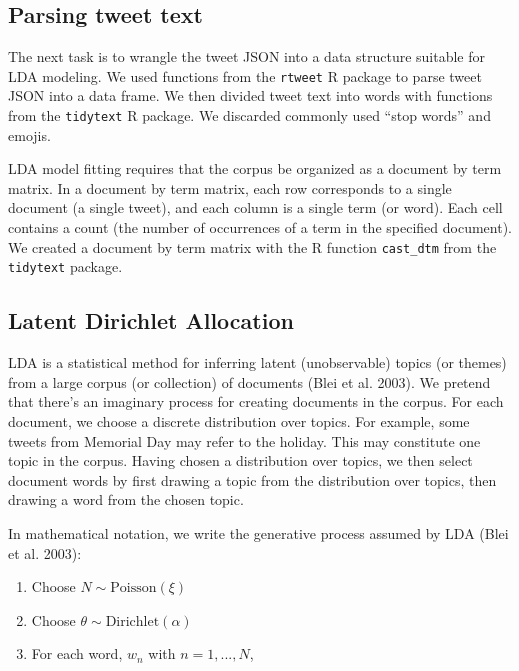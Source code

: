 \documentclass[
]{article}
\providecommand{\tightlist}{%
  \setlength{\itemsep}{0pt}\setlength{\parskip}{0pt}}
\begin{document}
\hypertarget{parsing-tweet-text}{%
\subsection{Parsing tweet text}\label{parsing-tweet-text}}

The next task is to wrangle the tweet JSON into a data structure suitable for LDA modeling.
We used functions from the \texttt{rtweet} R package to parse tweet JSON into a data frame.
We then divided tweet text into words with functions from the \texttt{tidytext} R package. We
discarded commonly used ``stop words'' and emojis.

LDA model fitting requires that the corpus be organized as a
document by term matrix. In a document by term matrix, each row corresponds to a single document (a single
tweet), and each column is a single term (or word). Each cell contains a
count (the number of
occurrences of a term in the specified document). We created a document by
term matrix with the R function \texttt{cast\_dtm} from the \texttt{tidytext} package.

\hypertarget{latent-dirichlet-allocation}{%
\subsection{Latent Dirichlet Allocation}\label{latent-dirichlet-allocation}}

LDA is a statistical method for inferring latent (unobservable) topics (or themes)
from a large corpus (or collection) of documents (Blei et al. 2003).
We pretend that there's an imaginary process for creating documents in the corpus. For each document,
we choose a discrete distribution over topics. For example, some tweets from Memorial Day may
refer to the holiday. This may constitute one topic in the corpus.
Having chosen a distribution over topics, we then select document words by first
drawing a topic from the distribution over topics, then drawing a word from the
chosen topic.

In mathematical notation, we write the generative process assumed by LDA (Blei et al. 2003):

\begin{enumerate}
\def\labelenumi{\arabic{enumi}.}
\tightlist
\item
  Choose \(N \sim \text{Poisson}(\xi)\)\\
\item
  Choose \(\theta \sim \text{Dirichlet}(\alpha)\)\\
\item
  For each word, \(w_n\) with \(n = 1, ..., N\),
\end{enumerate}
\end{document}

